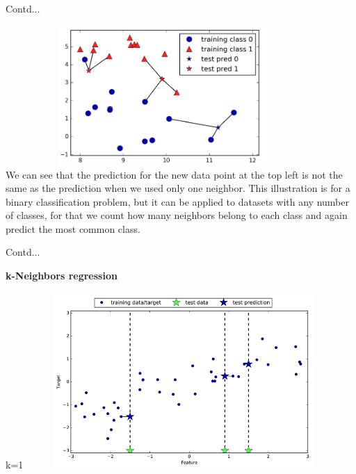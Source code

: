 \documentclass{beamer}
\newcommand\myheading[1]{%
  \par\bigskip
  {\Large\bfseries#1}\par\smallskip}
\begin{document}
\begin{frame}{Contd...}
\begin{flushleft}
\includegraphics[height= 5.3cm, width=12cm]{KNN_example2}\\
	 We can see that the prediction for the new data point at the top left is not the same as the prediction when we used only one neighbor.
This illustration is for a binary classification problem, but it can be applied to datasets with any number of classes, for that we count how many neighbors belong to each class and again predict the most common class.
	\end{flushleft}
\end{frame}

\begin{frame}{Contd...}
\begin{flushleft}
\myheading{k-Neighbors regression}k=1
	\includegraphics[height= 6.7cm, width=12cm]{KNN_example3}\\
	\end{flushleft}
\end{frame}
\end{document}
